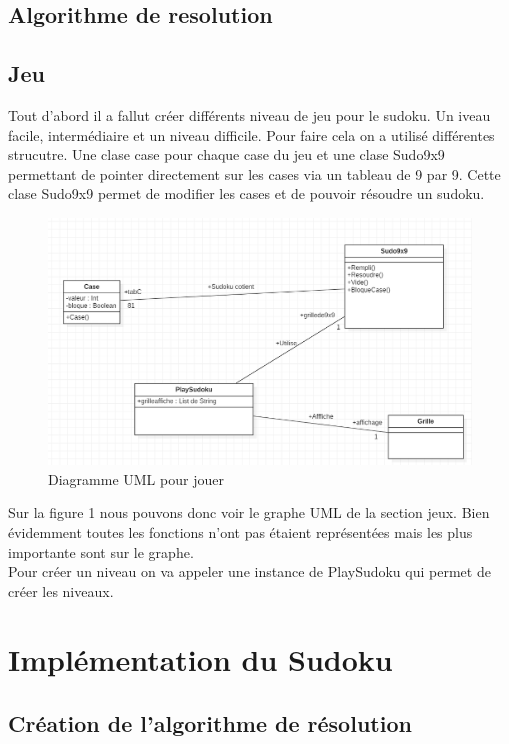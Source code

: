 \documentclass{article}
\begin{document}
\subsection{Algorithme de resolution}

\subsection{Jeu}
Tout d'abord il a fallut créer différents niveau de jeu pour le sudoku. Un iveau facile, intermédiaire et un niveau difficile. 
Pour faire cela on a utilisé différentes strucutre. Une clase case pour chaque case du jeu et une clase Sudo9x9 permettant de pointer directement sur les cases via un tableau de 9 par 9. Cette clase Sudo9x9 permet de modifier les cases et de pouvoir résoudre un sudoku. 

\begin{figure}[!h]
    \centering
    \includegraphics[scale=0.5]{Img/digramme.png}
    \caption{Diagramme UML pour jouer} 
\end{figure}

Sur la figure 1 nous pouvons donc voir le graphe UML de la section jeux. 
Bien évidemment toutes les fonctions n'ont pas étaient représentées mais les plus importante sont sur le graphe. \\
Pour créer un niveau on va appeler une instance de PlaySudoku qui permet de créer les niveaux. 




\section{Implémentation du Sudoku}

\subsection{Création de l'algorithme de résolution}
\end{document}
